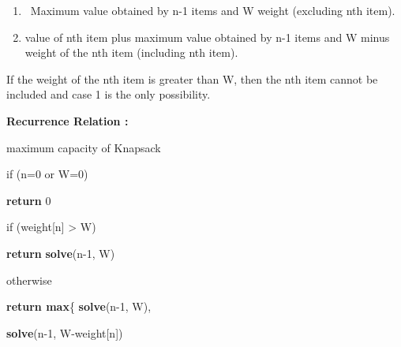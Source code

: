 \documentclass[letterpaper]{article}
\newcommand\liststyleWWNumiv{%
\renewcommand\theenumi{\arabic{enumi}}
\renewcommand\theenumii{\alph{enumii}}
\renewcommand\theenumiii{\roman{enumiii}}
\renewcommand\theenumiv{\arabic{enumiv}}
\renewcommand\labelenumi{\theenumi.}
\renewcommand\labelenumii{\theenumii.}
\renewcommand\labelenumiii{\theenumiii.}
\renewcommand\labelenumiv{\theenumiv.}
}
\begin{document}
\begin{multicols}{2}
\liststyleWWNumiv
\begin{enumerate}
\item \ Maximum value obtained by n-1 items and W weight (excluding nth item). 
\item value of nth item plus maximum value obtained by n-1 items and W minus weight of the nth item (including nth
item).
\end{enumerate}
If the weight of the nth item is greater than W, then the nth item cannot be included and case 1 is the only
possibility. 


\bigskip

{\bfseries
Recurrence Relation : }

maximum capacity of Knapsack 

if (n=0 or W=0) 

\textbf{return} 0 


\bigskip

if (weight[n] {\textgreater} W) 

\textbf{return} \textbf{solve}(n-1, W) 

otherwise 

\textbf{return max}\{ \textbf{solve}(n-1, W), 

\textbf{solve}(n-1, W-weight[n]) \ 


\bigskip
\end{multicols}
\end{document}
